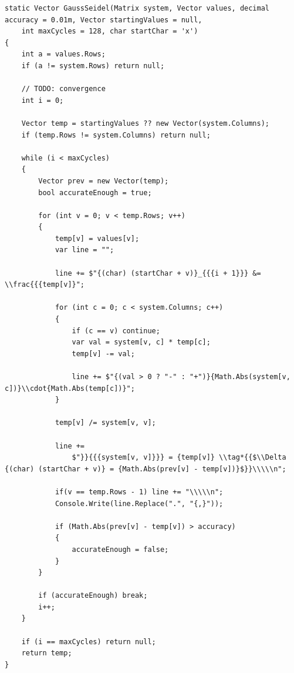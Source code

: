 \documentclass[12pt,a4paper]{article}
\begin{document}
\begin{lstlisting}
static Vector GaussSeidel(Matrix system, Vector values, decimal accuracy = 0.01m, Vector startingValues = null,
    int maxCycles = 128, char startChar = 'x')
{
    int a = values.Rows;
    if (a != system.Rows) return null;

    // TODO: convergence
    int i = 0;

    Vector temp = startingValues ?? new Vector(system.Columns);
    if (temp.Rows != system.Columns) return null;
    
    while (i < maxCycles)
    {
        Vector prev = new Vector(temp);
        bool accurateEnough = true;

        for (int v = 0; v < temp.Rows; v++)
        {
            temp[v] = values[v];
            var line = "";
            
            line += $"{(char) (startChar + v)}_{{{i + 1}}} &= \\frac{{{temp[v]}";
            
            for (int c = 0; c < system.Columns; c++)
            {
                if (c == v) continue;
                var val = system[v, c] * temp[c];
                temp[v] -= val;
                
                line += $"{(val > 0 ? "-" : "+")}{Math.Abs(system[v, c])}\\cdot{Math.Abs(temp[c])}";
            }

            temp[v] /= system[v, v];

            line +=
                $"}}{{{system[v, v]}}} = {temp[v]} \\tag*{{$\\Delta {(char) (startChar + v)} = {Math.Abs(prev[v] - temp[v])}$}}\\\\\n";
            
            if(v == temp.Rows - 1) line += "\\\\\n";
            Console.Write(line.Replace(".", "{,}"));

            if (Math.Abs(prev[v] - temp[v]) > accuracy)
            {
                accurateEnough = false;
            }
        }

        if (accurateEnough) break;
        i++;
    }

    if (i == maxCycles) return null;
    return temp;
}
\end{lstlisting}
\end{document}
